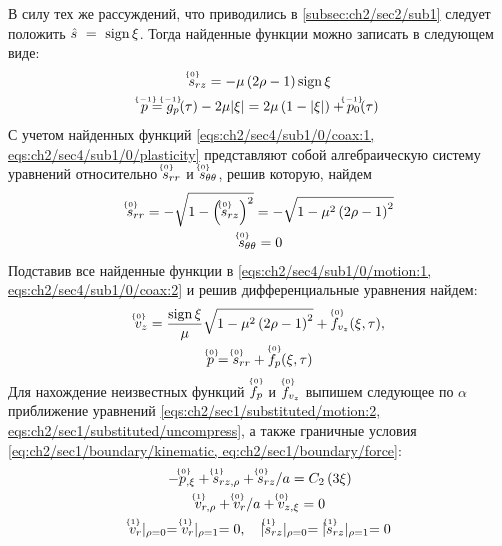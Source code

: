 В силу тех же рассуждений, что приводились в \ref{subsec:ch2/sec2/sub1} следует положить $\hat{s}~=~\sign\xi$. Тогда найденные функции можно записать в следующем виде:
\begin{gather}
  \label{sol:ch2/sec4/sub1/srz/0}
  \uindex{s}{0}_{rz} = -\mu \left(2\rho - 1\right) \sign \xi
  \\
  \label{sol:ch2/sec4/sub1/p/-1}
  \uindex{p}{-1} = \uindex{g}{-1}_{p}(\tau) -2\mu\lvert\xi\rvert = 2\mu\left(1-\lvert\xi\rvert\right) + \uindex{p}{-1}_{0}(\tau)
\end{gather}
С учетом найденных функций \cref{eqs:ch2/sec4/sub1/0/coax:1, eqs:ch2/sec4/sub1/0/plasticity} представляют собой алгебраическую систему уравнений относительно $\uindex{s}{0}_{rr}$ и $\uindex{s}{0}_{\theta\theta}$, решив которую, найдем
\begin{gather}
  \label{sol:ch2/sec4/sub1/srr/0}
  \uindex{s}{0}_{rr} = -\sqrt{1-\left(\uindex{s}{0}_{rz}\right)^2} = -\sqrt{1-\mu^2\left(2\rho-1\right)^2}
  \\
  \label{sol:ch2/sec4/sub1/stt/0}
  \uindex{s}{0}_{\theta\theta} = 0
\end{gather}
Подставив все найденные функции в \cref{eqs:ch2/sec4/sub1/0/motion:1, eqs:ch2/sec4/sub1/0/coax:2} и решив дифференциальные уравнения найдем:
\begin{gather}
  \label{sol:ch2/sec4/sub1/vz/0}
  \uindex{v}{0}_{z} = \frac{\sign\xi}{\mu}\sqrt{1-\mu^2\left(2\rho-1\right)^2} + \uindex{f}{0}_{v_{z}}(\xi,\tau),
  \\
  \label{sol:ch2/sec4/sub1/p/0}
  \uindex{p}{0} = \uindex{s}{0}_{rr} +\uindex{f}{0}_{p}(\xi,\tau)
\end{gather}
Для нахождение неизвестных функций $\uindex{f}{0}_{p}$ и $\uindex{f}{0}_{v_{z}}$ выпишем следующее по $\alpha$ приближение уравнений \cref{eqs:ch2/sec1/substituted/motion:2, eqs:ch2/sec1/substituted/uncompress}, а также граничные условия \cref{eq:ch2/sec1/boundary/kinematic, eq:ch2/sec1/boundary/force}:
\begin{subequations}
  \begin{gather}
    \label{eqs:ch2/sec4/sub1/1/motion:1}
    -\uindex{p}{0}_{,\xi} + \uindex{s}{1}_{rz,\rho} + \uindex{s}{0}_{rz} / a = C_2 \left(3\xi\right)
    \\
    \label{eqs:ch2/sec4/sub1/1/uncompress}
    \uindex{v}{1}_{r,\rho} + \uindex{v}{0}_{r} / a + \uindex{v}{0}_{z,\xi} = 0
    \\
    \label{eq:ch2/sec4/sub1/boundary/1}
    \uindex{v}{1}_{r}\lvert_{\rho=0} = \uindex{v}{1}_{r}\lvert_{\rho=1} = 0, \quad \lvert \uindex{s}{1}_{rz}\lvert_{\rho=0} = \lvert \uindex{s}{1}_{rz}\lvert_{\rho=1} = 0
  \end{gather}
\end{subequations}
